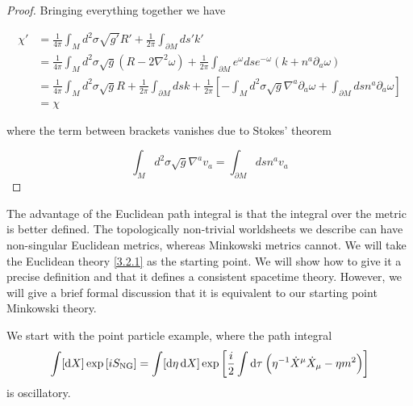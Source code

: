 \begin{tcolorbox}[breakable]
\begin{proof}
		Bringing everything together we have
		
		\begin{equation}
			\begin{aligned}
				\chi' &= \frac{1}{4\pi} \int_M d^2 \sigma \sqrt{g'} R' + \frac{1}{2\pi} \int_{\partial M} ds' k' \\
				&= \frac{1}{4\pi} \int_M d^2 \sigma \sqrt{g} (R - 2\nabla^2 \omega) + \frac{1}{2\pi} \int_{\partial M} e^{\omega} dse^{-\omega} (k + n^a \partial_a \omega) \\
				&= \frac{1}{4\pi} \int_M d^2 \sigma \sqrt{g} R + \frac{1}{2\pi} \int_{\partial M} ds k + \frac{1}{2\pi} \left[ -\int_M d^2 \sigma \sqrt{g} \nabla^a \partial_a \omega + \int_{\partial M} ds n^a \partial_a \omega \right] \\
				&= \chi
			\end{aligned}
		\end{equation}
		
		where the term between brackets vanishes due to Stokes' theorem
		
		\begin{equation}
			\int_M d^2 \sigma \sqrt{g} \nabla^a v_a = \int_{\partial M} ds n^a v_a
		\end{equation}
	\end{proof}
\end{tcolorbox}
The advantage of the Euclidean path integral is that the integral over the metric is better defined. The topologically non-trivial worldsheets we describe can have non-singular Euclidean metrics, whereas Minkowski metrics cannot. We will take the Euclidean theory \eqref{3.2.1} as the starting point. We will show how to give it a precise definition and that it defines a consistent spacetime theory.    
However, we will give a brief formal discussion that it is equivalent to our starting point Minkowski theory.    

We start with the point particle example, where the path integral    
\begin{equation}
	\int[\mathrm{d} X] \exp \left[iS_{\rm NG}\right]=\int[\mathrm{d} \eta \, \mathrm{d} X] \exp \left[\frac{i}{2} \int \mathrm{d} \tau\: \Bigl(\eta^{-1} \dot{X}^{\mu} \dot{X}_{\mu}-\eta m^{2}\Bigr)\right] \label{3.2.4}
\end{equation}
is oscillatory.  

